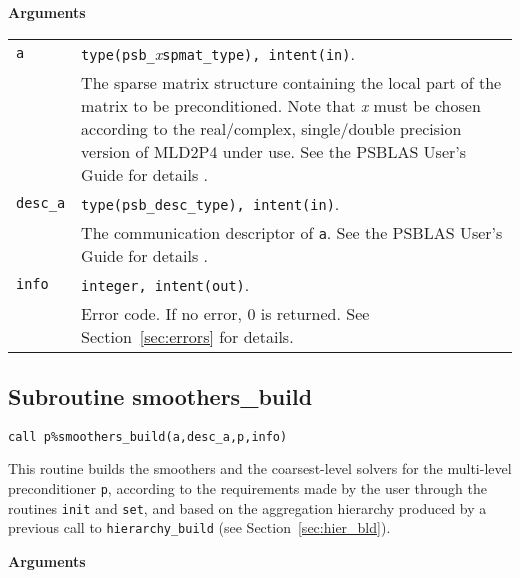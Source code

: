 {\baselineskip\noindent\large\bfseries Arguments} \smallskip

\begin{tabular}{p{1.2cm}p{12cm}}
\verb|a|      & \verb|type(psb_|\emph{x}\verb|spmat_type), intent(in)|. \\
              & The sparse matrix structure containing the local part of the
                matrix to be preconditioned. Note that \emph{x} must be chosen according
                to the real/complex, 
single/double precision version of MLD2P4 under use.
                See the PSBLAS User's Guide for details \cite{PSBLASGUIDE}.\\
\verb|desc_a| & \verb|type(psb_desc_type), intent(in)|. \\
              & The communication descriptor of \verb|a|. See the PSBLAS User's Guide for
                details \cite{PSBLASGUIDE}.\\
\verb|info|   & \verb|integer, intent(out)|.\\
              & Error code. If no error, 0 is returned. See Section~\ref{sec:errors} for details.\\
\end{tabular}


\clearpage

\subsection{Subroutine smoothers\_build\label{sec:smooth_bld}}
 

\begin{center}
\verb|call p%smoothers_build(a,desc_a,p,info)|\\
\end{center}

\noindent
This routine builds the smoothers and the coarsest-level solvers for the
multi-level preconditioner \verb|p|, according to the requirements made by
the user through the routines \verb|init| and \verb|set|, and based on the aggregation
hierarchy produced by a previous call to \verb|hierarchy_build|
(see Section~\ref{sec:hier_bld}). 

{\baselineskip\noindent\large\bfseries Arguments} \smallskip

